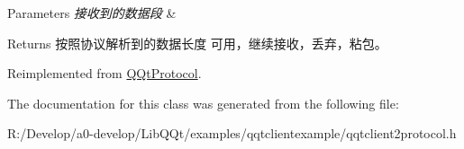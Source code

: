 \begin{DoxyParams}{Parameters}
{\em 接收到的数据段} & \\
\hline
\end{DoxyParams}
\begin{DoxyReturn}{Returns}
按照协议解析到的数据长度 可用，继续接收，丢弃，粘包。 
\end{DoxyReturn}


Reimplemented from \mbox{\hyperlink{class_q_qt_protocol_a00fd0c1ac23379ed3b9b25da9a34f39b}{Q\+Qt\+Protocol}}.



The documentation for this class was generated from the following file\+:\begin{DoxyCompactItemize}
\item 
R\+:/\+Develop/a0-\/develop/\+Lib\+Q\+Qt/examples/qqtclientexample/qqtclient2protocol.\+h\end{DoxyCompactItemize}
